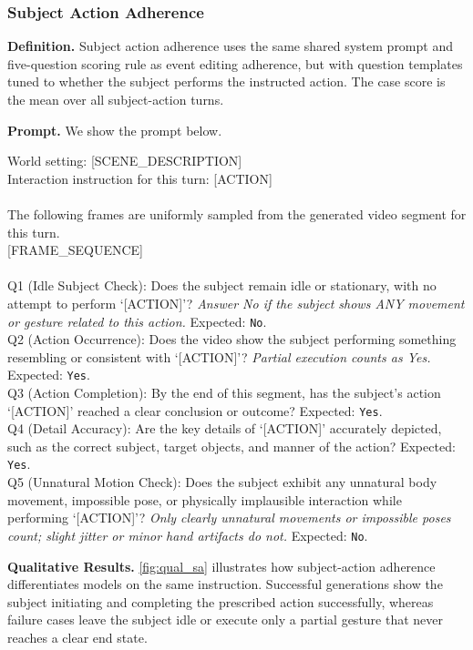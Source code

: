 \documentclass{llmxive}
\providecommand{\myparagraph}[1]{\vspace{-0.1em}\noindent\textbf{#1}\hspace{0.3em}}
\begin{document}
\subsubsection{Subject Action Adherence}
\label{app:subject_action_detail}

\myparagraph{Definition.}
Subject action adherence uses the same shared system prompt and five-question scoring rule as event editing adherence, but with question templates tuned to whether the subject performs the instructed action. The case score is the mean over all subject-action turns.

\myparagraph{Prompt.} We show the prompt below.

\begin{tcolorbox}[d3box, title={Subject Action Adherence (Q1--Q5)}]
\ttfamily\scriptsize
World setting: [SCENE\_DESCRIPTION]\\
Interaction instruction for this turn: [ACTION]\\
\\
The following frames are uniformly sampled from the generated video segment for this turn.\\
\mbox{[FRAME\_SEQUENCE]}\\
\\
Q1 (Idle Subject Check): Does the subject remain idle or stationary, with no attempt to perform `[ACTION]'? \emph{Answer No if the subject shows ANY movement or gesture related to this action.} Expected: \texttt{No}.\\
Q2 (Action Occurrence): Does the video show the subject performing something resembling or consistent with `[ACTION]'? \emph{Partial execution counts as Yes.} Expected: \texttt{Yes}.\\
Q3 (Action Completion): By the end of this segment, has the subject's action `[ACTION]' reached a clear conclusion or outcome? Expected: \texttt{Yes}.\\
Q4 (Detail Accuracy): Are the key details of `[ACTION]' accurately depicted, such as the correct subject, target objects, and manner of the action? Expected: \texttt{Yes}.\\
Q5 (Unnatural Motion Check): Does the subject exhibit any unnatural body movement, impossible pose, or physically implausible interaction while performing `[ACTION]'? \emph{Only clearly unnatural movements or impossible poses count; slight jitter or minor hand artifacts do not.} Expected: \texttt{No}.
\end{tcolorbox}

\myparagraph{Qualitative Results.}
\cref{fig:qual_sa} illustrates how subject-action adherence differentiates models on the same instruction. Successful generations show the subject initiating and completing the prescribed action successfully, whereas failure cases leave the subject idle or execute only a partial gesture that never reaches a clear end state.
\end{document}
